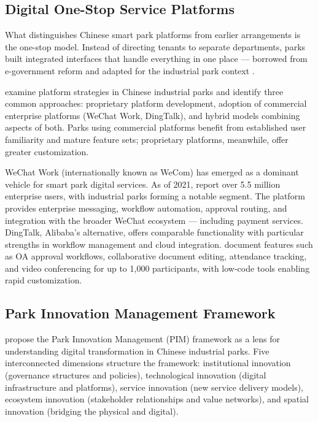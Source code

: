 \subsection{Digital One-Stop Service Platforms}

What distinguishes Chinese smart park platforms from earlier arrangements is the one-stop model. Instead of directing tenants to separate departments, parks built integrated interfaces that handle everything in one place --- borrowed from e-government reform and adapted for the industrial park context \citep{Yang2023}.

\citet{Schreieck2022} examine platform strategies in Chinese industrial parks and identify three common approaches: proprietary platform development, adoption of commercial enterprise platforms (WeChat Work, DingTalk), and hybrid models combining aspects of both. Parks using commercial platforms benefit from established user familiarity and mature feature sets; proprietary platforms, meanwhile, offer greater customization.

WeChat Work (internationally known as WeCom) has emerged as a dominant vehicle for smart park digital services. As of 2021, \citet{Tencent2024} report over 5.5 million enterprise users, with industrial parks forming a notable segment. The platform provides enterprise messaging, workflow automation, approval routing, and integration with the broader WeChat ecosystem --- including payment services. DingTalk, Alibaba's alternative, offers comparable functionality with particular strengths in workflow management and cloud integration. \citet{Alibaba2024} document features such as OA approval workflows, collaborative document editing, attendance tracking, and video conferencing for up to 1,000 participants, with low-code tools enabling rapid customization.

\subsection{Park Innovation Management Framework}

\citet{Yang2025} propose the Park Innovation Management (PIM) framework as a lens for understanding digital transformation in Chinese industrial parks. Five interconnected dimensions structure the framework: institutional innovation (governance structures and policies), technological innovation (digital infrastructure and platforms), service innovation (new service delivery models), ecosystem innovation (stakeholder relationships and value networks), and spatial innovation (bridging the physical and digital).

